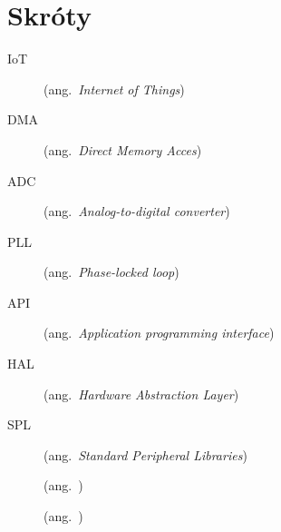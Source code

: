 \chapter*{Skróty}\mbox{}
\label{sec:skroty}
\noindent
\begin{description}
	\item [IoT] (ang.\ \emph{Internet of Things})
	\item [DMA] (ang.\ \emph{Direct Memory Acces})
	\item [ADC] (ang.\ \emph{Analog-to-digital converter})
	\item [PLL] (ang.\ \emph{Phase-locked loop})
	\item [API] (ang.\ \emph{Application programming interface})
	\item [HAL] (ang.\ \emph{Hardware Abstraction Layer})
	\item [SPL] (ang.\ \emph{Standard Peripheral Libraries})
	\item [] (ang.\ \emph{})
	\item [] (ang.\ \emph{})
\end{description}
